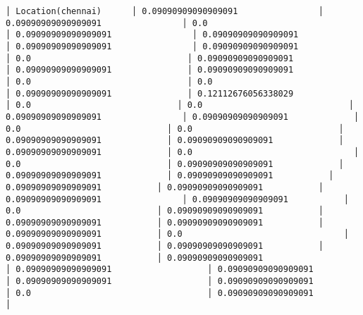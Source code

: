 \documentclass[11pt]{article}
\begin{document}
\begin{Verbatim}[commandchars=\\\{\}]
│ Location(chennai)      │ 0.09090909090909091                │ 0.09090909090909091                │ 0.0                                │ 0.09090909090909091                │ 0.09090909090909091                │ 0.09090909090909091                │ 0.09090909090909091                │ 0.0                               │ 0.09090909090909091               │ 0.09090909090909091               │ 0.09090909090909091                │ 0.0                               │ 0.0                               │ 0.09090909090909091               │ 0.12112676056338029             │ 0.0                             │ 0.0                             │ 0.09090909090909091                │ 0.09090909090909091             │ 0.0                             │ 0.0                             │ 0.09090909090909091             │ 0.09090909090909091             │ 0.09090909090909091             │ 0.0                                │ 0.0                             │ 0.09090909090909091             │ 0.09090909090909091             │ 0.09090909090909091           │ 0.09090909090909091           │ 0.09090909090909091           │ 0.09090909090909091                │ 0.09090909090909091           │ 0.0                           │ 0.09090909090909091           │ 0.09090909090909091           │ 0.09090909090909091           │ 0.09090909090909091           │ 0.0                                │ 0.09090909090909091           │ 0.09090909090909091           │ 0.09090909090909091           │ 0.09090909090909091                   │ 0.09090909090909091                   │ 0.09090909090909091                   │ 0.09090909090909091                   │ 0.09090909090909091                   │ 0.0                                   │ 0.09090909090909091                   │

\end{Verbatim}
\end{document}

